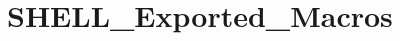 \hypertarget{group___s_h_e_l_l___exported___macros}{}\section{S\+H\+E\+L\+L\+\_\+\+Exported\+\_\+\+Macros}
\label{group___s_h_e_l_l___exported___macros}
